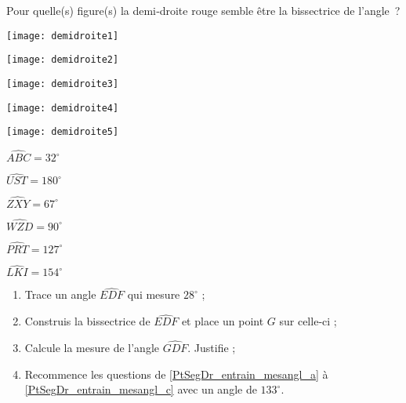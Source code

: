\begin{exercice}[Reconnaître]
Pour quelle(s) figure(s) la demi‑droite rouge semble être la bissectrice de l'angle ?
\begin{colenumerate}{3}
 \item  
 
 \texttt{[image: demidroite1]}
 \item 
 
 \texttt{[image: demidroite2]}
 \item 
 
 \texttt{[image: demidroite3]}
 \item 
 
 \texttt{[image: demidroite4]}
 \item
 
 \texttt{[image: demidroite5]}

 \end{colenumerate}
\end{exercice} 


\begin{exercice}
\begin{colenumerate}{3}
 \item $\widehat{ABC} = 32^\circ$
  \item $\widehat{UST} = 180^\circ$ 
  \item $\widehat{ZXY} = 67^\circ$
  \item $\widehat{WZD} = 90^\circ$
  \item $\widehat{PRT} = 127^\circ$
  \item $\widehat{LKI} = 154^\circ$
 \end{colenumerate}
\end{exercice} 


\begin{exercice}
\begin{enumerate}
 \item Trace un angle $\widehat{EDF}$ qui mesure $28^\circ$ ; \label{PtSegDr_entrain_mesangl_a}
 \item Construis la bissectrice de $\widehat{EDF}$ et place un point $G$ sur celle‑ci ;
 \item Calcule la mesure de l'angle $\widehat{GDF}$. Justifie ; \label{PtSegDr_entrain_mesangl_c}
 \item Recommence les questions de \ref{PtSegDr_entrain_mesangl_a} à \ref{PtSegDr_entrain_mesangl_c} avec un angle de $133^\circ$.
 \end{enumerate}
\end{exercice} 
